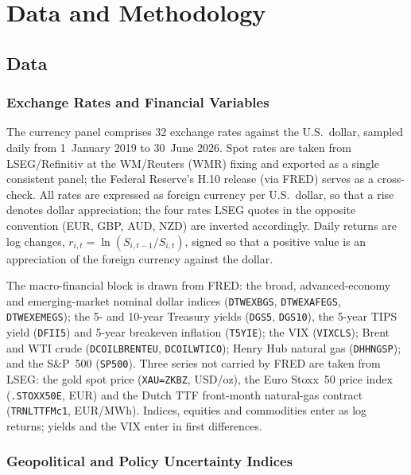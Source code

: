 
\chapter{Data and Methodology}
\label{ch:methodology}



\section{Data}
\label{sec:data}

\subsection{Exchange Rates and Financial Variables}
\label{sec:data_fx}

The currency panel comprises 32 exchange rates against the U.S.\ dollar, sampled daily from
1~January 2019 to 30~June 2026. Spot rates are taken from LSEG/Refinitiv at the WM/Reuters
(WMR) fixing and exported as a single consistent panel; the Federal Reserve's H.10 release
(via FRED) serves as a cross-check. All rates are expressed as foreign currency per U.S.\
dollar, so that a rise denotes dollar appreciation; the four rates LSEG quotes in the opposite
convention (EUR, GBP, AUD, NZD) are inverted accordingly. Daily returns are log changes,
$r_{i,t}=\ln(S_{i,t-1}/S_{i,t})$, signed so that a positive value is an appreciation of the
foreign currency against the dollar.

The macro-financial block is drawn from FRED: the broad, advanced-economy and
emerging-market nominal dollar indices (\texttt{DTWEXBGS}, \texttt{DTWEXAFEGS},
\texttt{DTWEXEMEGS}); the 5- and 10-year Treasury yields (\texttt{DGS5}, \texttt{DGS10}), the
5-year TIPS yield (\texttt{DFII5}) and 5-year breakeven inflation (\texttt{T5YIE}); the VIX
(\texttt{VIXCLS}); Brent and WTI crude (\texttt{DCOILBRENTEU}, \texttt{DCOILWTICO}); Henry Hub
natural gas (\texttt{DHHNGSP}); and the S\&P~500 (\texttt{SP500}). Three series not carried by
FRED are taken from LSEG: the gold spot price (\texttt{XAU=ZKBZ}, USD/oz), the Euro Stoxx~50
price index (\texttt{.STOXX50E}, EUR) and the Dutch TTF front-month natural-gas contract
(\texttt{TRNLTTFMc1}, EUR/MWh). Indices, equities and commodities enter as log returns;
yields and the VIX enter in first differences.

\subsection{Geopolitical and Policy Uncertainty Indices}
\label{sec:data_gpr}

